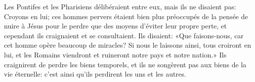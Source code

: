 Les Pontifes et les Pharisiens délibéraient entre eux,
	mais ils ne disaient pas: Croyons en lui;
	ces hommes pervers étaient bien plus préoccupés
		de la pensée de nuire à Jésus pour le perdre
	que des moyens d’éviter leur propre perte,
	et cependant ils craignaient et se consultaient.
Ils disaient: «Que faisons-nous, car cet homme opère beaucoup de miracles?
	Si nous le laissons ainsi, tous croiront en lui,
	et les Romains viendront et ruineront notre pays et notre nation.»
Ils craignirent de perdre les biens temporels,
	et ils ne songèrent pas aux biens de la vie éternelle:
	c’est ainsi qu’ils perdirent les uns et les autres.

